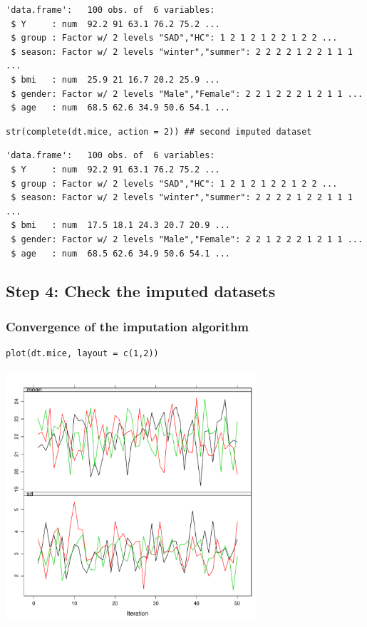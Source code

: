 \documentclass[12pt]{article}
\begin{document}
\begin{verbatim}
'data.frame':	100 obs. of  6 variables:
 $ Y     : num  92.2 91 63.1 76.2 75.2 ...
 $ group : Factor w/ 2 levels "SAD","HC": 1 2 1 2 1 2 2 1 2 2 ...
 $ season: Factor w/ 2 levels "winter","summer": 2 2 2 2 1 2 2 1 1 1 ...
 $ bmi   : num  25.9 21 16.7 20.2 25.9 ...
 $ gender: Factor w/ 2 levels "Male","Female": 2 2 1 2 2 2 1 2 1 1 ...
 $ age   : num  68.5 62.6 34.9 50.6 54.1 ...
\end{verbatim}


\lstset{language=r,label= ,caption= ,captionpos=b,numbers=none}
\begin{lstlisting}
str(complete(dt.mice, action = 2)) ## second imputed dataset
\end{lstlisting}

\begin{verbatim}
'data.frame':	100 obs. of  6 variables:
 $ Y     : num  92.2 91 63.1 76.2 75.2 ...
 $ group : Factor w/ 2 levels "SAD","HC": 1 2 1 2 1 2 2 1 2 2 ...
 $ season: Factor w/ 2 levels "winter","summer": 2 2 2 2 1 2 2 1 1 1 ...
 $ bmi   : num  17.5 18.1 24.3 20.7 20.9 ...
 $ gender: Factor w/ 2 levels "Male","Female": 2 2 1 2 2 2 1 2 1 1 ...
 $ age   : num  68.5 62.6 34.9 50.6 54.1 ...
\end{verbatim}


\clearpage

\subsection{Step 4: Check the imputed datasets}
\label{sec:org42ca17a}
\subsubsection{Convergence of the imputation algorithm}
\label{sec:org9cce740}

\lstset{language=r,label= ,caption= ,captionpos=b,numbers=none}
\begin{lstlisting}
plot(dt.mice, layout = c(1,2))
\end{lstlisting}

\begin{center}
\includegraphics[width=0.70\textwidth]{./figures/traceCVimputed.pdf}
\end{center}
\end{document}
